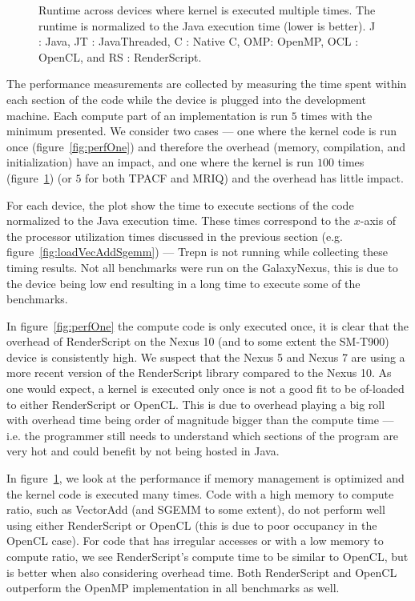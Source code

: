 \begin{figure}
  \caption{Runtime across devices where kernel is executed multiple times. The runtime is normalized to the Java execution time (lower is better). J : Java, JT : JavaThreaded, C : Native C, OMP: OpenMP, OCL : OpenCL, and RS : RenderScript.}
  \label{fig:perfMany}
\end{figure}


The performance measurements are collected by measuring the time
  spent within each section of the code while the device is plugged
  into the development machine.
Each compute part of an implementation is run $5$ times with the minimum
  presented.
We consider two cases --- one where the kernel code is run once (figure~\ref{fig:perfOne}) and therefore
  the overhead (memory, compilation, and initialization) have an impact,
  and one where the kernel is run $100$ times (figure~\ref{fig:perfMany}) (or $5$ for both TPACF and MRIQ)
  and the overhead has little impact.

For each device, the plot show the time to execute sections of the code normalized
  to the Java execution time.
These times correspond to the $x$-axis of the processor utilization times discussed
  in the previous section (e.g. figure~\ref{fig:loadVecAddSgemm}) --- Trepn is not
  running while collecting these timing results.
Not all benchmarks were run on the GalaxyNexus, this is due to the device
  being low end resulting in a long time to execute some of the benchmarks.

In figure~\ref{fig:perfOne} the compute code is only executed once, it is clear that 
  the overhead of RenderScript on the Nexus 10 (and to some extent the SM-T900) device is consistently high.
We suspect that the Nexus 5 and Nexus 7 are using a more recent version of the RenderScript library compared to the Nexus 10.
As one would expect, a kernel is executed only once is not a good fit to be of-loaded to either RenderScript or OpenCL.
This is due to overhead playing a big roll with overhead time being order of magnitude bigger than the compute time ---
  i.e. the programmer still needs to understand which sections of the program are very hot and could benefit by not being hosted 
  in Java.

In figure~\ref{fig:perfMany}, we look at the performance if memory management is optimized and the kernel code is executed 
  many times.
Code with a high memory to compute ratio, such as VectorAdd (and SGEMM to some extent), do not perform well using either
  RenderScript or OpenCL (this is due to poor occupancy in the OpenCL case).
For code that has irregular accesses or with a low memory to compute ratio, we see RenderScript's compute time to be similar
  to OpenCL, but is better when also considering overhead time.
Both RenderScript and OpenCL outperform the OpenMP implementation in all benchmarks as well.


